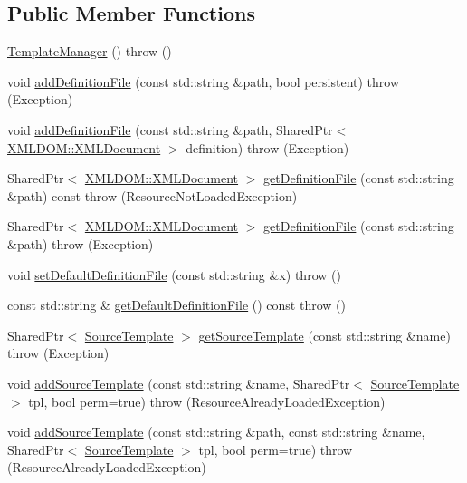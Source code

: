 \subsection*{Public Member Functions}
\begin{DoxyCompactItemize}
\item 
\hyperlink{classAudio_1_1TemplateManager_ab2e4aea1a61540b3ee8d85e4e308ebad}{Template\+Manager} ()  throw ()
\item 
void \hyperlink{classAudio_1_1TemplateManager_a2b119f54bfe5273f5d4cdae9068189b1}{add\+Definition\+File} (const std\+::string \&path, bool persistent)  throw (\+Exception)
\item 
void \hyperlink{classAudio_1_1TemplateManager_ad76a82d86800913f3fa0ce60d91b1a7a}{add\+Definition\+File} (const std\+::string \&path, Shared\+Ptr$<$ \hyperlink{classXMLDOM_1_1XMLDocument}{X\+M\+L\+D\+O\+M\+::\+X\+M\+L\+Document} $>$ definition)  throw (\+Exception)
\item 
Shared\+Ptr$<$ \hyperlink{classXMLDOM_1_1XMLDocument}{X\+M\+L\+D\+O\+M\+::\+X\+M\+L\+Document} $>$ \hyperlink{classAudio_1_1TemplateManager_a2291778045ec34331cdd324082c80909}{get\+Definition\+File} (const std\+::string \&path) const   throw (\+Resource\+Not\+Loaded\+Exception)
\item 
Shared\+Ptr$<$ \hyperlink{classXMLDOM_1_1XMLDocument}{X\+M\+L\+D\+O\+M\+::\+X\+M\+L\+Document} $>$ \hyperlink{classAudio_1_1TemplateManager_aded9885db09bfa5f2adeef4ab7dd6b7f}{get\+Definition\+File} (const std\+::string \&path)  throw (\+Exception)
\item 
void \hyperlink{classAudio_1_1TemplateManager_a03ddc9b5a016e2140b84efca9a2fe20d}{set\+Default\+Definition\+File} (const std\+::string \&x)  throw ()
\item 
const std\+::string \& \hyperlink{classAudio_1_1TemplateManager_a30d309c998849eafcf18bc1524f7ed0b}{get\+Default\+Definition\+File} () const   throw ()
\item 
Shared\+Ptr$<$ \hyperlink{classAudio_1_1SourceTemplate}{Source\+Template} $>$ \hyperlink{classAudio_1_1TemplateManager_a2ad1459769666d84a15a8c7dd5354264}{get\+Source\+Template} (const std\+::string \&name)  throw (\+Exception)
\item 
void \hyperlink{classAudio_1_1TemplateManager_a47d60d03c1322a19246669484fcefc8e}{add\+Source\+Template} (const std\+::string \&name, Shared\+Ptr$<$ \hyperlink{classAudio_1_1SourceTemplate}{Source\+Template} $>$ tpl, bool perm=true)  throw (\+Resource\+Already\+Loaded\+Exception)
\item 
void \hyperlink{classAudio_1_1TemplateManager_a4f3986632d0328894a31baa62a51a344}{add\+Source\+Template} (const std\+::string \&path, const std\+::string \&name, Shared\+Ptr$<$ \hyperlink{classAudio_1_1SourceTemplate}{Source\+Template} $>$ tpl, bool perm=true)  throw (\+Resource\+Already\+Loaded\+Exception)
\end{DoxyCompactItemize}

